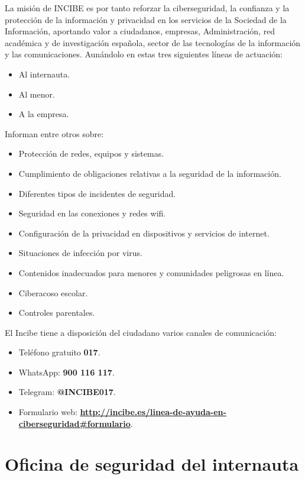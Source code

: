 \documentclass[
  a4paper,
  openany]{book}
\begin{document}
La misión de INCIBE es por tanto reforzar la ciberseguridad, la confianza y la protección de la información y privacidad en los servicios de la Sociedad de la Información, aportando valor a ciudadanos, empresas, Administración, red académica y de investigación española, sector de las tecnologías de la información y las comunicaciones. Aunándolo en estas tres siguientes líneas de actuación:

\begin{itemize}
\item
  Al internauta.
\item
  Al menor.
\item
  A la empresa.
\end{itemize}

Informan entre otros sobre:

\begin{itemize}
\item
  Protección de redes, equipos y sistemas.
\item
  Cumplimiento de obligaciones relativas a la seguridad de la información.
\item
  Diferentes tipos de incidentes de seguridad.
\item
  Seguridad en las conexiones y redes wifi.
\item
  Configuración de la privacidad en dispositivos y servicios de internet.
\item
  Situaciones de infección por virus.
\item
  Contenidos inadecuados para menores y comunidades peligrosas en línea.
\item
  Ciberacoso escolar.
\item
  Controles parentales.
\end{itemize}

El Incibe tiene a disposición del ciudadano varios canales de comunicación:

\begin{itemize}
\item
  Teléfono gratuito \textbf{017}.
\item
  WhatsApp: \textbf{900 116 117}.
\item
  Telegram: \textbf{@INCIBE017}.
\item
  Formulario web: \textbf{\url{http://incibe.es/linea-de-ayuda-en-ciberseguridad\#formulario}}.
\end{itemize}

\hypertarget{oficina-de-seguridad-del-internauta}{%
\section{Oficina de seguridad del internauta}\label{oficina-de-seguridad-del-internauta}}
\end{document}
